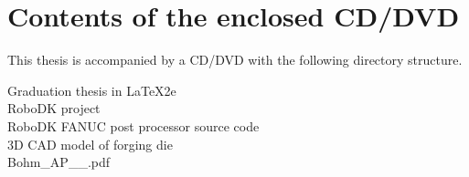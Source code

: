 ﻿\chapter{Contents of the enclosed CD/DVD \label{ch:ApendCD}}

This thesis is accompanied by a CD/DVD with the following directory structure.

\begin{description}

    \item[Graduation thesis in \LaTeX2e] 
            
    \item[RoboDK project] 

    \item[RoboDK FANUC post processor source code] 

    \item[3D CAD model of forging die] 

    \item[Bohm\_AP\_\the\value{YearOld}\_\Year.pdf] 

\end{description}


